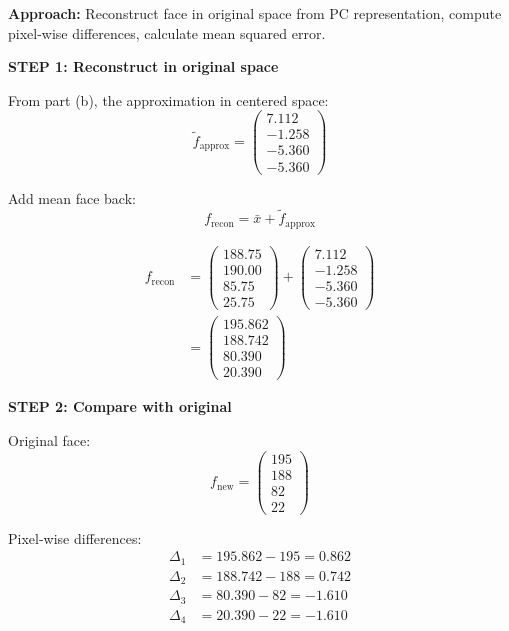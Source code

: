 \documentclass[12pt]{article}
\begin{document}
\begin{solution}

\textbf{Approach:} Reconstruct face in original space from PC representation, compute pixel-wise differences, calculate mean squared error.

\textbf{STEP 1: Reconstruct in original space}

From part (b), the approximation in centered space:
\[
\tilde{f}_{\text{approx}} = \begin{pmatrix}
7.112 \\
-1.258 \\
-5.360 \\
-5.360
\end{pmatrix}
\]

Add mean face back:
\[
f_{\text{recon}} = \bar{x} + \tilde{f}_{\text{approx}}
\]

\begin{align*}
f_{\text{recon}} &= \begin{pmatrix}
188.75 \\
190.00 \\
85.75 \\
25.75
\end{pmatrix} + \begin{pmatrix}
7.112 \\
-1.258 \\
-5.360 \\
-5.360
\end{pmatrix} \\
&= \begin{pmatrix}
195.862 \\
188.742 \\
80.390 \\
20.390
\end{pmatrix}
\end{align*}

\textbf{STEP 2: Compare with original}

Original face:
\[
f_{\text{new}} = \begin{pmatrix}
195 \\
188 \\
82 \\
22
\end{pmatrix}
\]

Pixel-wise differences:
\begin{align*}
\Delta_1 &= 195.862 - 195 = 0.862 \\
\Delta_2 &= 188.742 - 188 = 0.742 \\
\Delta_3 &= 80.390 - 82 = -1.610 \\
\Delta_4 &= 20.390 - 22 = -1.610
\end{align*}


\end{solution}
\end{document}
